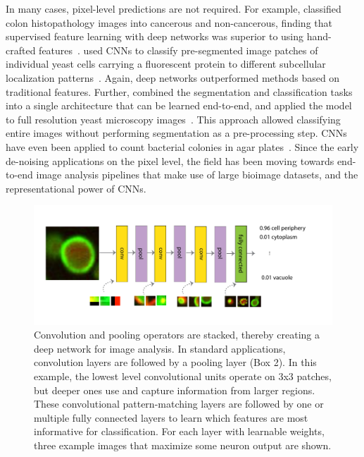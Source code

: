 In many cases, pixel-level predictions are not required. For example, \citet{xu_deep_2014} classified colon histopathology images into cancerous and non-cancerous, finding that supervised feature learning with deep networks was superior to using hand-crafted features~\citep{xu_deep_2014}. \citet{parnamaa_accurate_2016} used CNNs to classify pre-segmented image patches of individual yeast cells carrying a fluorescent protein to different subcellular localization patterns~\citep{parnamaa_accurate_2016}. Again, deep networks outperformed methods based on traditional features. Further, \citet{kraus_classifying_2015} combined the segmentation and classification tasks into a single architecture that can be learned end-to-end, and applied the model to full resolution yeast microscopy images~\citep{kraus_classifying_2015}. This approach allowed classifying entire images without performing segmentation as a pre-processing step. CNNs have even been applied to count bacterial colonies in agar plates~\citep{ferrari_bacterial_2015}. Since the early de-noising applications on the pixel level, the field has been moving towards end-to-end image analysis pipelines that make use of large bioimage datasets, and the representational power of CNNs.

\begin{figure}[htbp!]
\centering
\includegraphics[width=1.0\textwidth]{image}
\caption[Deep neural network for image analysis.]{Convolution and pooling operators are stacked, thereby creating a deep network for image analysis. In standard applications, convolution layers are followed by a pooling layer (Box 2). In this example, the lowest level convolutional units operate on 3x3 patches, but deeper ones use and capture information from larger regions. These convolutional pattern-matching layers are followed by one or multiple fully connected layers to learn which features are most informative for classification. For each layer with learnable weights, three example images that maximize some neuron output are shown.}
\label{fig:dl_image}
\end{figure}


